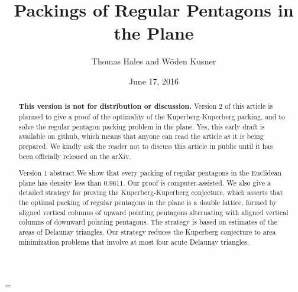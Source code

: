 \documentclass{amsart}
\theoremstyle{plain}
\theoremstyle{definition}
\theoremstyle{remark}
\begin{document}
\title
    {Packings of Regular Pentagons in the Plane}
\author{Thomas Hales and W\"oden Kusner}
\date{June 17, 2016}

\begin{abstract}  
{\bf This version is not for distribution or discussion.}
Version 2 of this article is planned to give a proof of the optimality of the Kuperberg-Kuperberg packing,
and to solve the regular pentagon packing problem in the plane.  Yes, this early draft is available on
github, which means that anyone can read the article as it is being prepared.  We kindly ask
the reader not to discuss this article in public until it has been officially released on the arXiv.

{\sc Version 1 abstract.}\quad We show that every packing of regular pentagons in the Euclidean plane has
density less than $0.9611$.   Our proof is computer-assisted.  We also 
give a detailed strategy for proving the Kuperberg-Kuperberg
conjecture, which asserts that the optimal packing of regular pentagons in the plane is a double lattice,
formed by aligned vertical columns of upward pointing pentagons alternating
with aligned vertical columns of downward pointing pentagons.  The strategy is based on estimates
of the areas of Delaunay triangles.  Our strategy reduces the Kuperberg conjecture to
area minimization problems that involve at most four acute Delaunay triangles.
\end{abstract}


\parskip=\baselineskip

 \maketitle



    

      
      
       
%
      
      
%





%
\end{document}
